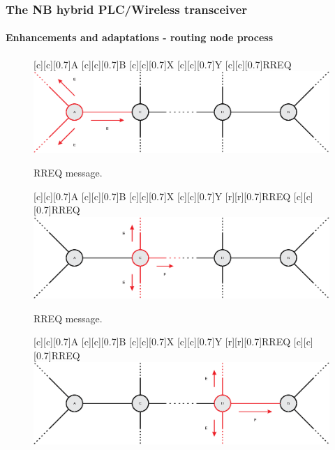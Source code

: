 \documentclass[mathserif]{beamer}
\begin{document}
\begin{frame}
	\frametitle{The NB hybrid PLC/Wireless transceiver}
	\framesubtitle{Enhancements and adaptations - routing node process}
	\renewcommand{\sizeLetter}{0.7}
	\begin{overprint}
		{
			\begin{figure}[ht]
				[c][c][\sizeLetter]{A}
				[c][c][\sizeLetter]{B}
				[c][c][\sizeLetter]{X}
				[c][c][\sizeLetter]{Y}
				[c][c][\sizeLetter]{\alert{RREQ}}
				\centering
				\includegraphics[width=\linewidth]{figuras/routing1}
				\caption{RREQ message.}
			\end{figure}
		}
		{
			\begin{figure}[ht]
				[c][c][\sizeLetter]{A}
				[c][c][\sizeLetter]{B}
				[c][c][\sizeLetter]{X}
				[c][c][\sizeLetter]{Y}
				[r][r][\sizeLetter]{\alert{RREQ}}
				[c][c][\sizeLetter]{\alert{RREQ}}
				\centering
				\includegraphics[width=\linewidth]{figuras/routing2}
				\caption{RREQ message.}
			\end{figure}
		}
		{
			\begin{figure}[ht]
				[c][c][\sizeLetter]{A}
				[c][c][\sizeLetter]{B}
				[c][c][\sizeLetter]{X}
				[c][c][\sizeLetter]{Y}
				[r][r][\sizeLetter]{\alert{RREQ}}
				[c][c][\sizeLetter]{\alert{RREQ}}
				\centering
				\includegraphics[width=\linewidth]{figuras/routing3}

\end{figure}}
\end{overprint}
\end{frame}
\end{document}
